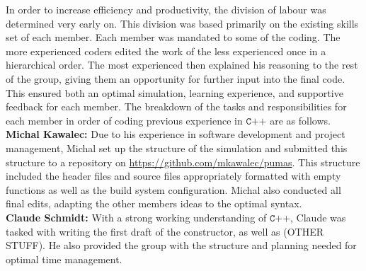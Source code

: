 \documentclass[a4paper,11pt]{article}
\begin{document}
In order to increase efficiency and productivity, the division of labour was determined very early on.  This division was based primarily on the existing skills set of each member.  Each member was mandated to some of the coding. The more experienced coders edited the work of the less experienced once in a hierarchical order. The most experienced then explained his reasoning to the rest of the group, giving them an opportunity for further input into the final code.  This ensured both an optimal simulation, learning experience, and supportive feedback for each member.  The breakdown of the tasks and responsibilities for each member in order of coding previous experience in $\texttt{C++}$ are as follows.
\\

\noindent\textbf{Michal Kawalec:}  Due to his experience in software development and project management, Michal set up the structure of the simulation and submitted this structure to a repository on \url{https://github.com/mkawalec/pumas}.  This structure included the header files and source files appropriately formatted with empty functions as well as the build system configuration. Michal also conducted all final edits, adapting the other members ideas to the optimal syntax.
\\

\noindent\textbf{Claude  Schmidt:}   With a strong working understanding of $\texttt{C++}$, Claude was tasked with writing the first draft of the constructor, as well as (OTHER STUFF).  He also provided the group with the structure and planning needed for optimal time management.  
\\
\end{document}
